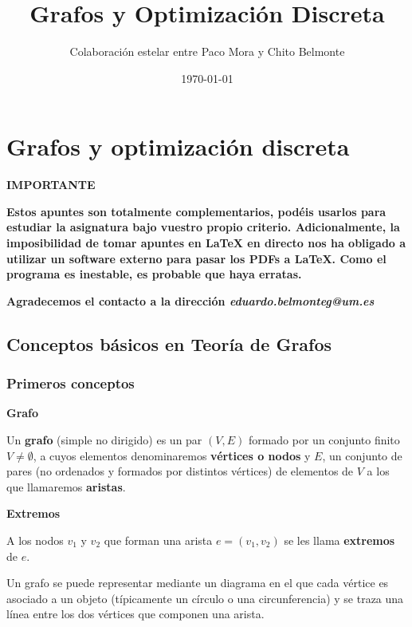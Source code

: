 \documentclass[openany]{book}
\title{Grafos y Optimización Discreta}
\author{Colaboración estelar entre Paco Mora y Chito Belmonte}
\date{\today}
\begin{document}
\maketitle

\tableofcontents


\part{Grafos y optimización discreta}

\textbf{IMPORTANTE}

\textbf{Estos apuntes son totalmente complementarios, podéis usarlos para estudiar la asignatura bajo vuestro propio criterio. Adicionalmente, la imposibilidad de tomar apuntes en LaTeX en directo nos ha obligado a utilizar un software externo para pasar los PDFs a LaTeX. Como el programa es inestable, es probable que haya erratas.}

\textbf{Agradecemos el contacto a la dirección \textit{eduardo.belmonteg@um.es}}

\chapter{Conceptos básicos en Teoría de Grafos}

\section{Primeros conceptos}


\begin{definition}
  { \color{turquoise} \textbf{Grafo}}

  Un \textbf{grafo} (simple no dirigido) es un par $(V,E)$ formado por un conjunto finito $V \ne \emptyset$, a cuyos elementos denominaremos \textbf{vértices o nodos} y $E$, un conjunto de pares (no ordenados y formados por distintos vértices) de elementos de $V$  a los que llamaremos \textbf{aristas}.
\end{definition}

\begin{definition}
  { \color{turquoise} \textbf{Extremos}}

  A los nodos $ v_1 $ y $ v_2 $ que forman una arista $e=(v_1, v_2)$ se les llama \textbf{extremos} de $ e $.
\end{definition}

Un grafo se puede representar mediante un diagrama en el que cada vértice es asociado a un objeto (típicamente un círculo o una circunferencia) y se traza una línea entre los dos vértices que componen una arista.
\end{document}
